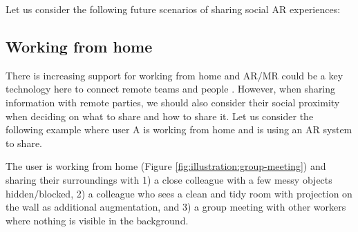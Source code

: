

Let us consider the following future scenarios of sharing social AR experiences:

\subsection{Working from home}

There is increasing support for working from home \cite{Bloom2015, Crosbie2004, Olson1984} and AR/MR could be a key technology here to connect remote teams and people \cite{Koehne2012, Maarouf2012}. However, when sharing information with remote parties, we should also consider their social proximity when deciding on what to share and how to share it. Let us consider the following example where user A is working from home and is using an AR system to share.

The user is working from home (Figure \ref{fig:illustration:group-meeting}) and sharing their surroundings with 1) a close colleague with a few messy objects hidden/blocked, 2) a colleague who sees a clean and tidy room with projection on the wall as additional augmentation, and 3) a group meeting with other workers where nothing is visible in the background. 

